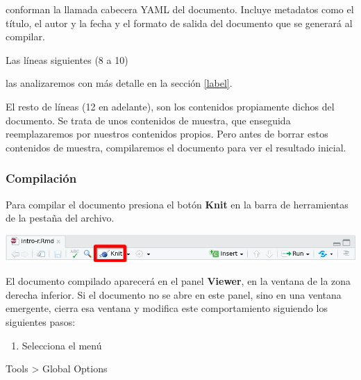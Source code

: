 \documentclass[
  degree=mecinf,
  title=normal,
  toc=normal,
  bib=normal]{mnye}
\newenvironment{menu}{
    \begin{center}
    \sffamily\bfseries
}{
    \end{center}
}
\providecommand{\tightlist}{%
  \setlength{\itemsep}{0pt}\setlength{\parskip}{0pt}}
\newenvironment{Shaded}{\begin{snugshade}}{\end{snugshade}}
\newcommand{\InformationTok}[1]{\textcolor[rgb]{0.56,0.35,0.01}{\textbf{\textit{#1}}}}
\begin{document}
conforman la llamada cabecera YAML del documento. Incluye metadatos como el título, el autor y la fecha y el formato de salida del documento que se generará al compilar.

Las líneas siguientes (8 a 10)

\begin{Shaded}
\end{Shaded}

las analizaremos con más detalle en la sección \ref{label}.

El resto de líneas (12 en adelante), son los contenidos propiamente dichos del documento. Se trata de unos contenidos de muestra, que enseguida reemplazaremos por nuestros contenidos propios. Pero antes de borrar estos contenidos de muestra, compilaremos el documento para ver el resultado inicial.

\hypertarget{compilaciuxf3n}{%
\subsubsection{Compilación}\label{compilaciuxf3n}}

Para compilar el documento presiona el botón \textbf{Knit} en la barra de herramientas de la pestaña del archivo.

\begin{center}\includegraphics[width=1\linewidth]{images/knit} \end{center}

El documento compilado aparecerá en el panel \textbf{Viewer}, en la ventana de la zona derecha inferior.
Si el documento no se abre en este panel, sino en una ventana emergente, cierra esa ventana y modifica este comportamiento siguiendo los siguientes pasos:

\begin{enumerate}
\def\labelenumi{\arabic{enumi}.}
\tightlist
\item
  Selecciona el menú
\end{enumerate}

\begin{menu}
Tools \textgreater{} Global Options

\end{menu}
\end{document}
